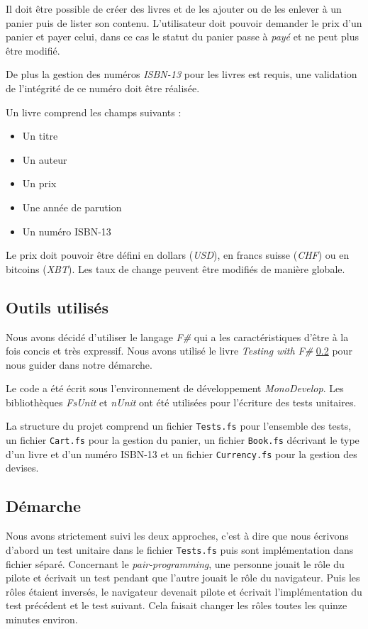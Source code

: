 \documentclass[journal, a4paper, frenchb]{IEEEtran}
\begin{document}
Il doit être possible de créer des livres et de les ajouter ou de les enlever à un panier puis de lister son contenu. L'utilisateur doit pouvoir demander le prix d'un panier et payer celui, dans ce cas le statut du panier passe à \emph{payé} et ne peut plus être modifié.

De plus la gestion des numéros \emph{ISBN-13} pour les livres est requis, une validation de l'intégrité de ce numéro doit être réalisée.

Un livre comprend les champs suivants :
\begin{itemize}
   \item Un titre
   \item Un auteur
   \item Un prix
   \item Une année de parution
   \item Un numéro ISBN-13
\end{itemize}

Le prix doit pouvoir être défini en dollars (\emph{USD}), en francs suisse (\emph{CHF}) ou en bitcoins (\emph{XBT}). Les taux de change peuvent être modifiés de manière globale.


\subsection{Outils utilisés}

Nous avons décidé d'utiliser le langage \emph{F\#} qui a les caractéristiques d'être à la fois concis et très expressif. Nous avons utilisé le livre \emph{Testing with F\#} \ref{} pour nous guider dans notre démarche.

Le code a été écrit sous l'environnement de développement \emph{MonoDevelop}. Les bibliothèques \emph{FsUnit} et \emph{nUnit} ont été utilisées pour l'écriture des tests unitaires.

La structure du projet comprend un fichier \texttt{Tests.fs} pour l'ensemble des tests, un fichier \texttt{Cart.fs} pour la gestion du panier, un fichier \texttt{Book.fs} décrivant le type d'un livre et d'un numéro ISBN-13 et un fichier \texttt{Currency.fs} pour la gestion des devises.


\subsection{Démarche}

Nous avons strictement suivi les deux approches, c'est à dire que nous écrivons d'abord un test unitaire dans le fichier \texttt{Tests.fs} puis sont implémentation dans fichier séparé. Concernant le \emph{pair-programming}, une personne jouait le rôle du pilote et écrivait un test pendant que l'autre jouait le rôle du navigateur. Puis les rôles étaient inversés, le navigateur devenait pilote et écrivait l'implémentation du test précédent et le test suivant. Cela faisait changer les rôles toutes les quinze minutes environ.
\end{document}
